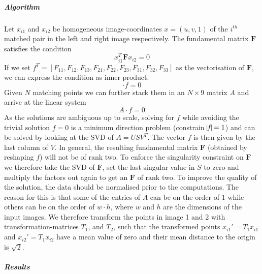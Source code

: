 \documentclass{paper}
\begin{document}
\subparagraph{Algorithm}
Let $x_{i1}$ and $x_{i2}$ be homogeneous image-coordinates $x=(u,v,1)$ of  the $i^{th}$ matched pair in the left and right image respectively. The fundamental matrix $\mathbf{F}$ satisfies the condition
\begin{equation} 
x_{i1}^T\mathbf{F}x_{i2} = 0
\end{equation}
If we set $f^T=[F_{11},F_{12},F_{13},F_{21},F_{22},F_{23},F_{31},F_{32},F_{33}]$ as the vectorisation of $\mathbf{F}$, we can express the condition as inner product:
\begin{equation} 
[u_{i2}u_{i1}, u_{i2}v_{i1}, u_{i2}, v_{i2}u_{i1}, v_{i2}v_{i1}, v_{i2}, u_{i1}, v_{i1}, 1]\cdot f = 0
\end{equation}
Given $N$ matching points we can further stack them in an $N\times9$ matrix $A$ and arrive at the linear system 
\begin{equation} 
A\cdot f = 0
\label{eq:linsys}
\end{equation}
As the solutions are ambiguous up to scale, solving for $f$ while avoiding the trivial solution $f=0$ is a minimum direction problem (constrain $\vline f\vline=1$) and can be solved by looking at the SVD of $A=USV^T$. The vector $f$ is then given by the last column of $V$.
In general, the resulting fundamental matrix $\mathbf{F}$ (obtained by reshaping $f$) will not be of rank two. To enforce the singularity constraint on $\mathbf{F}$ we therefore take the SVD of $\mathbf{F}$, set the last singular value in $S$ to zero and multiply the factors out again to get an $\mathbf{F}$ of rank two.
To improve the quality of the solution, the data should be normalised prior to the computations. The reason for this is that some of the entries of $A$ can be on the order of $1$ while others can be on the order of $w\cdot h$, where $w$ and $h$ are the dimensions of the input images. We therefore transform the points in image 1 and 2 with transformation-matrices $T_1$, and $T_2$, such that the transformed points $x_{i1}'=T_1x_{i1}$ and $x_{i2}'=T_1x_{i2}$ have a mean value of zero and their mean distance to the origin is $\sqrt{2}$.

\subparagraph{Results}
\end{document}
